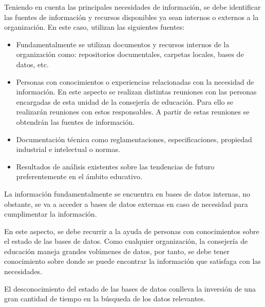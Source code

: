 Teniendo en cuenta las principales necesidades de información, se debe identificar las fuentes de información y recursos disponibles ya sean internos o externos a la organización. En este caso, utilizan las siguientes fuentes:
\begin{itemize}
	\item Fundamentalmente se utilizan documentos y recursos internos de la organización como: repositorios documentales, carpetas locales, bases de datos, etc.
	\item Personas con conocimientos o experiencias relacionadas con la necesidad de información. En este aspecto se realizan distintas reuniones con las personas encargadas de esta unidad de la consejería de educación. Para ello se realizarán reuniones con estos responsables. A partir de estas reuniones se obtendrán las fuentes de información.
	\item Documentación técnica como reglamentaciones, especificaciones, propiedad industrial e intelectual o normas.
	\item Resultados de análisis existentes sobre las tendencias de futuro preferentemente en el ámbito educativo.
\end{itemize}


La información fundamentalmente se encuentra en bases de datos internas, no obstante, se va a acceder a bases de datos externas en caso de necesidad para cumplimentar la información. 

En este aspecto, se debe recurrir a la ayuda de personas con conocimientos sobre el estado de las bases de datos. Como cualquier organización, la consejería de educación maneja grandes volúmenes de datos, por tanto, se debe tener conocimiento sobre donde se puede encontrar la información que satisfaga con las necesidades. 

El desconocimiento del estado de las bases de datos conlleva la inversión de una gran cantidad de tiempo en la búsqueda de los datos relevantes. 


